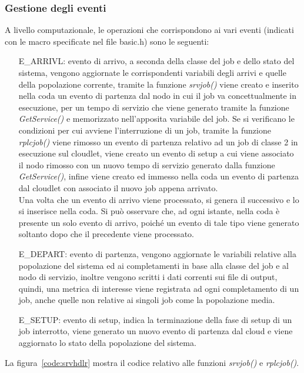 \subsubsection{Gestione degli eventi}
A livello computazionale, le operazioni che corrispondono ai vari eventi
(indicati con le macro specificate nel file basic.h) sono le seguenti:
\begin{itemize}
\item[E\_ARRIVL:] evento di arrivo, a seconda della classe del job e dello stato
del sistema, vengono aggiornate le corrispondenti variabili degli arrivi e
quelle della popolazione corrente, tramite la funzione \emph{srvjob()} viene
creato e inserito nella coda un evento di partenza dal nodo in cui il job va
concettualmente in esecuzione, per un tempo di servizio che viene generato
tramite la funzione \emph{GetService()} e memorizzato nell’apposita variabile
del job. Se si verificano le condizioni per cui avviene l’interruzione di un
job, tramite la funzione \emph{rplcjob()} viene rimosso un evento di partenza
relativo ad un job di classe 2 in esecuzione sul cloudlet, viene creato un
evento di setup a cui viene associato il nodo rimosso con un nuovo tempo di
servizio generato dalla funzione \emph{GetService()}, infine viene creato ed
immesso nella coda un evento di partenza dal cloudlet con associato il nuovo job
appena arrivato.\\
Una volta che un evento di arrivo viene processato, si genera il successivo e lo
si inserisce nella coda. Si può osservare che, ad ogni istante, nella coda è
presente un solo evento di arrivo, poiché un evento di tale tipo viene generato
soltanto dopo che il precedente viene processato.
\item[E\_DEPART:] evento di partenza, vengono aggiornate le variabili relative
alla popolazione del sistema ed ai completamenti in base alla classe del job e
al nodo di servizio, inoltre vengono scritti i dati correnti sui file di output,
quindi, una metrica di interesse viene registrata ad ogni completamento di un
job, anche quelle non relative ai singoli job come la popolazione media.
\item[E\_SETUP:] evento di setup, indica la terminazione della fase di setup di
un job interrotto, viene generato un nuovo evento di partenza dal cloud e viene
aggiornato lo stato della popolazione del sistema.
\end{itemize}
La figura~\ref{code:srvhdlr} mostra il codice relativo alle funzioni
\emph{srvjob()} e \emph{rplcjob()}.
%
%
